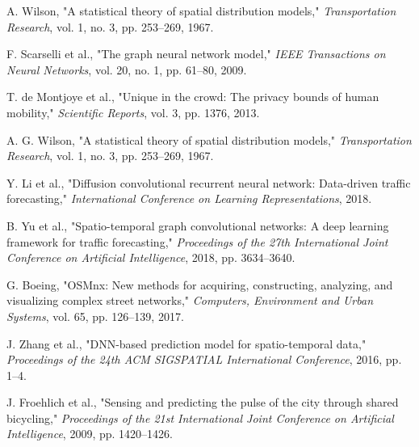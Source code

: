 \documentclass[twocolumn,11pt]{IEEEtran}  %
\begin{document}
\begin{thebibliography}{00}
 A. Wilson, "A statistical theory of spatial distribution models," \textit{Transportation Research}, vol. 1, no. 3, pp. 253--269, 1967.

 F. Scarselli et al., "The graph neural network model," \textit{IEEE Transactions on Neural Networks}, vol. 20, no. 1, pp. 61--80, 2009.

 T. de Montjoye et al., "Unique in the crowd: The privacy bounds of human mobility," \textit{Scientific Reports}, vol. 3, pp. 1376, 2013.

 A. G. Wilson, "A statistical theory of spatial distribution models," \textit{Transportation Research}, vol. 1, no. 3, pp. 253--269, 1967.

 Y. Li et al., "Diffusion convolutional recurrent neural network: Data-driven traffic forecasting," \textit{International Conference on Learning Representations}, 2018.

 B. Yu et al., "Spatio-temporal graph convolutional networks: A deep learning framework for traffic forecasting," \textit{Proceedings of the 27th International Joint Conference on Artificial Intelligence}, 2018, pp. 3634--3640.

 G. Boeing, "OSMnx: New methods for acquiring, constructing, analyzing, and visualizing complex street networks," \textit{Computers, Environment and Urban Systems}, vol. 65, pp. 126--139, 2017.

 J. Zhang et al., "DNN-based prediction model for spatio-temporal data," \textit{Proceedings of the 24th ACM SIGSPATIAL International Conference}, 2016, pp. 1--4.

 J. Froehlich et al., "Sensing and predicting the pulse of the city through shared bicycling," \textit{Proceedings of the 21st International Joint Conference on Artificial Intelligence}, 2009, pp. 1420--1426.

\end{thebibliography}
\end{document}
